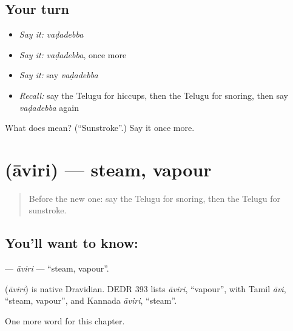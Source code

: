 \subsection*{Your turn}
\begin{itemize}
\raggedright
  \item \emph{Say it:} \emph{vaḍadebba}
  \item \emph{Say it:} \emph{vaḍadebba}, once more
  \item \emph{Say it:} say \emph{vaḍadebba}
  \item \emph{Recall:} say the Telugu for hiccups, then the Telugu for snoring, then say \emph{vaḍadebba} again
\end{itemize}

\begin{tcolorbox}[breakable,colback=teal!4,colframe=teal!35!black,title={Before you move on}]
What does  mean? (\textquotedblleft{}Sunstroke\textquotedblright{}.) Say it once more.
\end{tcolorbox}
\section[\texorpdfstring{\te{ఆవిరి} (āviri)}{ఆవిరి (āviri)}]{ (āviri) — steam, vapour}

\label{lesson:TE-C211-aviri}



\begin{quote}
Before the new one: say the Telugu for snoring, then the Telugu for sunstroke.
\end{quote}

\subsection*{You'll want to know: }
\textbf{} — \emph{āviri} — \textquotedblleft{}steam, vapour\textquotedblright{}.

\begin{cousinweb}
\textbf{} (\emph{āviri}) is native Dravidian. DEDR 393 lists \emph{āviri}, \textquotedblleft{}vapour\textquotedblright{}, with Tamil \emph{āvi}, \textquotedblleft{}steam, vapour\textquotedblright{}, and Kannada \emph{āviri}, \textquotedblleft{}steam\textquotedblright{}.
\end{cousinweb}

\begin{grammarlens}[title={What you've built}]
One more word for this chapter.
\end{grammarlens}

